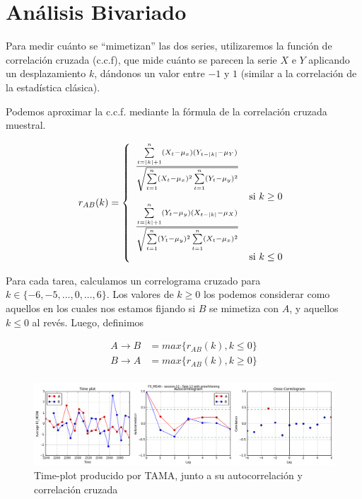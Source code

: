 \section{Análisis Bivariado}

\newcommand{\varnorm}[1] {
    (#1_t - \mu_{\lowercase{#1}})
}

\newcommand{\squarederr}[1]{
    \sum\limits_{t=1}^n \varnorm{#1}^2
}

\newcommand{\crosscorr}[2]{
  \frac{\sum\limits_{t=|k|+1}^n \varnorm{#1} (#2_{t-|k|} - \mu_{#2})}{
    \sqrt{\squarederr{#1} \squarederr{#2}}
  } \\
}

Para medir cuánto se ``mimetizan'' las dos series, utilizaremos la función de correlación cruzada (c.c.f), que mide cuánto se parecen la serie $X$ e $Y$ aplicando un desplazamiento $k$, dándonos un valor entre $-1$ y $1$ (similar a la correlación de la estadística clásica).

Podemos aproximar la c.c.f. mediante la fórmula de la correlación cruzada muestral.

\begin{equation}
  r_{AB}(k) =
  \left\{
    \begin{array}{ll}
      \crosscorr{X}{Y} & \mbox{si } k \geq 0 \\
      \crosscorr{Y}{X} & \mbox{si } k \leq 0
    \end{array}
  \right.
\end{equation}

Para cada tarea, calculamos un correlograma cruzado para $k \in \{-6, -5, \ldots, 0, \ldots , 6\}$. Los valores de $k \geq 0$ los podemos considerar como aquellos en los cuales nos estamos fijando si $B$ se mimetiza con $A$, y aquellos $k \leq 0$ al revés. Luego, definimos

\begin{align}
  A \rightarrow B &= max \{ r_{AB}(k), k \leq 0 \} \\
  B \rightarrow A &= max \{ r_{AB}(k), k \geq 0 \} \\
\end{align}




\begin{figure}
\centering
\includegraphics[width=15cm]{images/time_plot_with_cross_correlation.png}
\caption{Time-plot producido por TAMA, junto a su autocorrelación y correlación cruzada\label{time_plot_with_bivariate}}

\end{figure}

